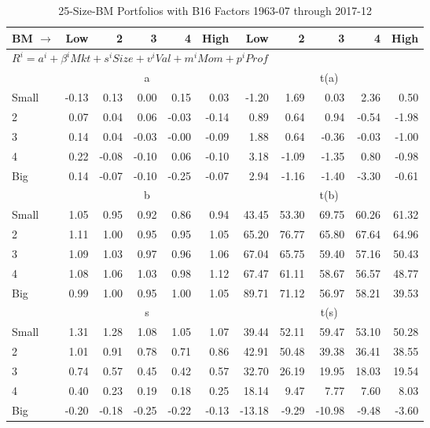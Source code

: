 
\begin{table}[!ht]
\footnotesize
\centering
\caption{25-Size-BM Portfolios with B16 Factors 1963-07 through 2017-12}
\begin{tabular}{lrrrrrrrrrr}
  \toprule
    
    BM $\rightarrow$ & Low & 2 & 3 & 4 & High & Low & 2 & 3 & 4 & High  \\ 
  \midrule
  \multicolumn{11}{l}{$R^i=a^i+\beta^iMkt+s^iSize+v^iVal+m^iMom+p^iProf$}  \\
  
     & \multicolumn{5}{c}{a} & \multicolumn{5}{c}{t(a)}   \\
     \cmidrule(r){2-6} \cmidrule(r){7-11} 
    Small  & -0.13  & 0.13  & 0.00  & 0.15  & 0.03  & -1.20  & 1.69  & 0.03  & 2.36  & 0.50   \\
    2  & 0.07  & 0.04  & 0.06  & -0.03  & -0.14  & 0.89  & 0.64  & 0.94  & -0.54  & -1.98   \\
    3  & 0.14  & 0.04  & -0.03  & -0.00  & -0.09  & 1.88  & 0.64  & -0.36  & -0.03  & -1.00   \\
    4  & 0.22  & -0.08  & -0.10  & 0.06  & -0.10  & 3.18  & -1.09  & -1.35  & 0.80  & -0.98   \\
    Big  & 0.14  & -0.07  & -0.10  & -0.25  & -0.07  & 2.94  & -1.16  & -1.40  & -3.30  & -0.61   \\
    
  
     & \multicolumn{5}{c}{b} & \multicolumn{5}{c}{t(b)}   \\
     \cmidrule(r){2-6} \cmidrule(r){7-11} 
    Small  & 1.05  & 0.95  & 0.92  & 0.86  & 0.94  & 43.45  & 53.30  & 69.75  & 60.26  & 61.32   \\
    2  & 1.11  & 1.00  & 0.95  & 0.95  & 1.05  & 65.20  & 76.77  & 65.80  & 67.64  & 64.96   \\
    3  & 1.09  & 1.03  & 0.97  & 0.96  & 1.06  & 67.04  & 65.75  & 59.40  & 57.16  & 50.43   \\
    4  & 1.08  & 1.06  & 1.03  & 0.98  & 1.12  & 67.47  & 61.11  & 58.67  & 56.57  & 48.77   \\
    Big  & 0.99  & 1.00  & 0.95  & 1.00  & 1.05  & 89.71  & 71.12  & 56.97  & 58.21  & 39.53   \\
    
  
     & \multicolumn{5}{c}{s} & \multicolumn{5}{c}{t(s)}   \\
     \cmidrule(r){2-6} \cmidrule(r){7-11} 
    Small  & 1.31  & 1.28  & 1.08  & 1.05  & 1.07  & 39.44  & 52.11  & 59.47  & 53.10  & 50.28   \\
    2  & 1.01  & 0.91  & 0.78  & 0.71  & 0.86  & 42.91  & 50.48  & 39.38  & 36.41  & 38.55   \\
    3  & 0.74  & 0.57  & 0.45  & 0.42  & 0.57  & 32.70  & 26.19  & 19.95  & 18.03  & 19.54   \\
    4  & 0.40  & 0.23  & 0.19  & 0.18  & 0.25  & 18.14  & 9.47  & 7.77  & 7.60  & 8.03   \\
    Big  & -0.20  & -0.18  & -0.25  & -0.22  & -0.13  & -13.18  & -9.29  & -10.98  & -9.48  & -3.60   \\
    

\end{tabular}
\end{table}
